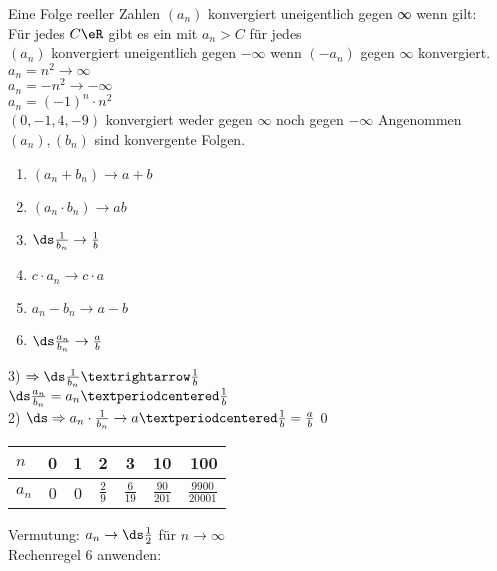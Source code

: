 %
\setcounter{chapter}{3}
\setcounter{section}{9}
%
\wdh
Eine Folge reeller Zahlen $(a_n)$ konvergiert uneigentlich gegen ∞ wenn gilt:\\
Für jedes $C\eR$ gibt es ein \nN{} mit $a_n > C$ für jedes \nN\\[4pt]
$(a_n)$ konvergiert uneigentlich gegen $- \infty$ wenn $(-a_n)$ gegen $\infty$ konvergiert.\\
%
%
\bsp
$a_n = n^2 \to \infty$\\
$a_n = -n^2 \to -\infty$\\
$a_n = (-1)^n \cdot n^2$\\
$(0, -1, 4, -9)$ konvergiert weder gegen $\infty$ noch gegen $ - \infty$
%
Angenommen $(a_n), (b_n)$ sind konvergente Folgen.\\
\begin{enumerate}
\item{$(a_n + b_n) \to a + b$}
\item{$(a_n \cdot b_n) \to ab$}
\item{$\ds\frac{1}{b_n} \to \frac{1}{b}$}
\item{$c \cdot a_n \to c \cdot a$}
\item{$a_n - b_n \to a - b$}
\item{$\ds\frac{a_n}{b_n} \to \frac{a}{b}$}
\end{enumerate}
%
3) $\Rightarrow\ds\frac{1}{b_n}→\frac{1}{b}$\\
$\ds\frac{a_n}{b_n} = a_n ·\frac{1}{b}$\\
2) $\ds\Rightarrow a_n \cdot \frac{1}{b_n} \to a ·\frac{1}{b} = \frac{a}{b}$\qed
%
\bsp
\begin{tabular}{l|c|c|c|c|c|r}
$n$   & 0 & 1 & 2 & 3 & 10 & 100\\\hline
$a_n$ & 0 & 0 & $\frac{2}{9}$ & $\frac{6}{19}$ & $\frac{90}{201}$ & $\frac{9900}{20001}$ \\
\end{tabular}
\vspace{5mm}
Vermutung: $a_n \to \ds\frac{1}{2}$ für $n \to \infty$\\
Rechenregel 6 anwenden:\\
